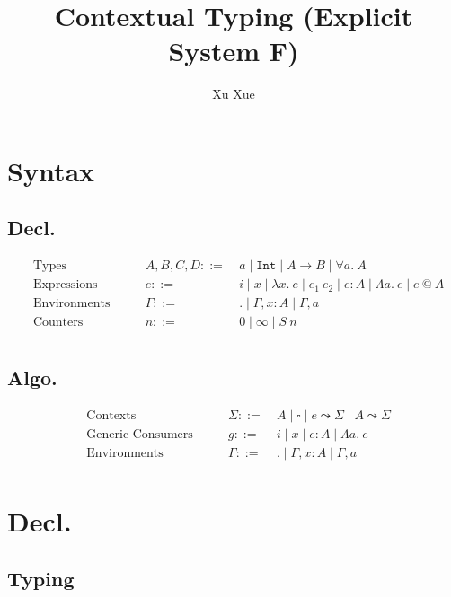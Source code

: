 \documentclass{article}
\title{Contextual Typing (Explicit System F)}
\author{Xu Xue}
\begin{document}
\maketitle

\section{Syntax}

\subsection{Decl.}

\begin{align*}
&\text{Types} \quad\quad &A, B, C, D ::=&~ a \mid \mathtt{Int} \mid A \rightarrow B \mid \forall a.~A \\
&\text{Expressions} \quad \quad &e::=&~ i \mid x \mid \lambda x . ~e \mid e_1~e_2 \mid e : A \mid \Lambda a.~e \mid e ~@~ A\\
&\text{Environments} \quad\quad &\Gamma::=&~ . \mid \Gamma, x : A \mid \Gamma, a\\
&\text{Counters} \quad\quad &n ::=&~ 0 \mid \infty \mid S~n\\
\end{align*}

\subsection{Algo.}

\begin{align*}
    &\text{Contexts} \quad\quad &\Sigma ::=&~ A \mid \square \mid \boxed{e} \leadsto \Sigma \mid \boxed{A} \leadsto \Sigma\\
    &\text{Generic Consumers} \quad \quad &g::=&~ i \mid x \mid e : A \mid \Lambda a.~e  \\
    &\text{Environments} \quad\quad &\Gamma ::=&~ . \mid \Gamma, x : A \mid \Gamma, a \\
\end{align*}


\section{Decl.}

\subsection{Typing}
\end{document}
